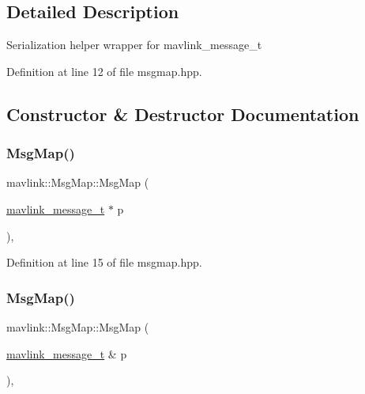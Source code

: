 \subsection{Detailed Description}
Serialization helper wrapper for mavlink\+\_\+message\+\_\+t 

Definition at line 12 of file msgmap.\+hpp.



\subsection{Constructor \& Destructor Documentation}
\mbox{\label{classmavlink_1_1MsgMap_a584e0a807eb17833430f919d1d0952f3}} 
\subsubsection{\texorpdfstring{MsgMap()}{MsgMap()}\hspace{0.1cm}{\footnotesize\ttfamily [1/3]}}
{\footnotesize\ttfamily mavlink\+::\+Msg\+Map\+::\+Msg\+Map (\begin{DoxyParamCaption}\item[{\mbox{\hyperlink{include__v0_89_2mavlink__types_8h_a63b963764c09dc72f4910c1521e325b9}{mavlink\+\_\+message\+\_\+t}} $\ast$}]{p }\end{DoxyParamCaption})\hspace{0.3cm}{\ttfamily [inline]}, {\ttfamily [explicit]}}



Definition at line 15 of file msgmap.\+hpp.

\mbox{\label{classmavlink_1_1MsgMap_ac901b93ec973e7dbdb8ef8ceace9d8b0}} 
\subsubsection{\texorpdfstring{MsgMap()}{MsgMap()}\hspace{0.1cm}{\footnotesize\ttfamily [2/3]}}
{\footnotesize\ttfamily mavlink\+::\+Msg\+Map\+::\+Msg\+Map (\begin{DoxyParamCaption}\item[{\mbox{\hyperlink{include__v0_89_2mavlink__types_8h_a63b963764c09dc72f4910c1521e325b9}{mavlink\+\_\+message\+\_\+t}} \&}]{p }\end{DoxyParamCaption})\hspace{0.3cm}{\ttfamily [inline]}, {\ttfamily [explicit]}}




